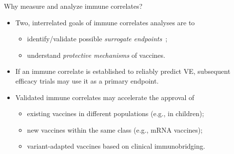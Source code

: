 \documentclass{beamer}
\begin{document}

\begin{frame}[c]{Why measure and analyze immune correlates?}

\begin{center}
\begin{itemize}
  \itemsep8pt
  \item Two, interrelated goals of immune correlates analyses are to
    \begin{itemize}
      \itemsep0pt
      \item identify/validate possible \textit{surrogate
        endpoints}~\citep{prentice1989surrogate};
      \item understand \textit{protective mechanisms} of vaccines.
    \end{itemize}
  \item If an immune correlate is established to reliably predict VE,
    subsequent efficacy trials may use it as a primary endpoint.
  \item Validated immune correlates may accelerate the approval of
    \begin{itemize}
      \itemsep0pt
      \item existing vaccines in different populations (e.g., in children);
      \item new vaccines within the same class (e.g., mRNA vaccines);
      \item variant-adapted vaccines based on clinical immunobridging.
    \end{itemize}
\end{itemize}
\end{center}

\note{
}

\end{frame}

\end{document}

